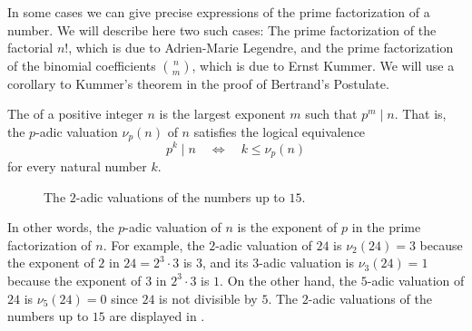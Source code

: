 In some cases we can give precise expressions of the prime factorization of a number. We will describe here two such cases: The prime factorization of the factorial $n!$, which is due to Adrien-Marie Legendre, and the prime factorization of the binomial coefficients $\binom{n}{m}$, which is due to Ernst Kummer. We will use a corollary to Kummer's theorem in the proof of Bertrand's Postulate.

\begin{definition}
  The  of a positive integer $n$ is the largest exponent $m$ such that $p^m\mid n$. That is, the $p$-adic valuation $\nu_p(n)$ of $n$ satisfies the logical equivalence
  \begin{equation*}
    p^k\mid n\quad\Leftrightarrow\quad k\leq \nu_p(n)
  \end{equation*}
  for every natural number $k$.
\end{definition}

\begin{figure}[t]
  \centering
  \caption[The $2$-adic valuations of the numbers up to $15$]{The $2$-adic valuations of the numbers up to $15$.}
  \label{figure:2-adic-valuation}
\end{figure}

In other words, the $p$-adic valuation of $n$ is the exponent of $p$ in the prime factorization of $n$. For example, the $2$-adic valuation of $24$ is $\nu_2(24)=3$ because the exponent of $2$ in $24=2^3\cdot 3$ is $3$, and its $3$-adic valuation is $\nu_3(24)=1$ because the exponent of $3$ in $2^3\cdot 3$ is $1$. On the other hand, the $5$-adic valuation of $24$ is $\nu_5(24)=0$ since $24$ is not divisible by $5$. The $2$-adic valuations of the numbers up to $15$ are displayed in .

